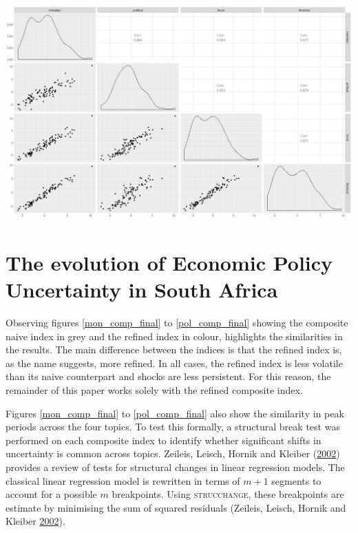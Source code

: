 \documentclass[11pt,preprint, authoryear]{elsarticle}
\let\origfigure\figure
\let\endorigfigure\endfigure
\renewenvironment{figure}[1][2] {
    \expandafter\origfigure\expandafter[H]
} {
    \endorigfigure
}
\numberwithin{equation}{section}
\numberwithin{figure}{section}
\numberwithin{table}{section}
\begin{document}
\begin{figure}
	\centering
	\includegraphics[width=\linewidth, keepaspectratio]{bin/corr}\\
	\caption{Correlation matrix of refined composite indices per topic. \label{fig_corr}}
\end{figure}

\section{\texorpdfstring{The evolution of Economic Policy Uncertainty in
South Africa
\label{sec_discuss}}{The evolution of Economic Policy Uncertainty in South Africa }}\label{the-evolution-of-economic-policy-uncertainty-in-south-africa}

Observing figures \ref{mon_comp_final} to \ref{pol_comp_final} showing
the composite naive index in grey and the refined index in colour,
highlights the similarities in the results. The main difference between
the indices is that the refined index is, as the name suggests, more
refined. In all cases, the refined index is less volatile than its naive
counterpart and shocks are less persistent. For this reason, the
remainder of this paper works solely with the refined composite index.

Figures \ref{mon_comp_final} to \ref{pol_comp_final} also show the
similarity in peak periods across the four topics. To test this
formally, a structural break test was performed on each composite index
to identify whether significant shifts in uncertainty is common across
topics. Zeileis, Leisch, Hornik and Kleiber (\protect\hyperlink{ref-Zeilis2002}{2002}) provides a review of tests for structural changes in linear regression models. The classical linear regression model is rewritten in terms of $m+1$ segments to account for a possible $m$ breakpoints. Using \textsc{strucchange}, these breakpoints are estimate by minimising the sum of squared residuals (Zeileis, Leisch, Hornik and Kleiber \protect\hyperlink{ref-Zeilis2002}{2002}). 
\end{document}
